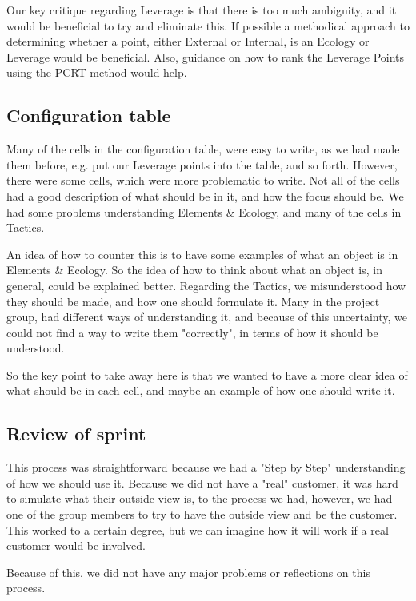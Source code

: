 Our key critique regarding Leverage is that there is too much ambiguity, and it would be beneficial to try and eliminate this. 
If possible a methodical approach to determining whether a point, either External or Internal, is an Ecology or Leverage would be beneficial.
Also, guidance on how to rank the Leverage Points using the PCRT method would help.

\subsection{Configuration table}
Many of the cells in the configuration table, were easy to write, as we had made them before, e.g. put our Leverage points into the table, and so forth.
However, there were some cells, which were more problematic to write.
Not all of the cells had a good description of what should be in it, and how the focus should be.
We had some problems understanding Elements \& Ecology, and many of the cells in Tactics.

An idea of how to counter this is to have some examples of what an object is in Elements \& Ecology.
So the idea of how to think about what an object is, in general, could be explained better. 
Regarding the Tactics, we misunderstood how they should be made, and how one should formulate it.
Many in the project group, had different ways of understanding it, and because of this uncertainty, we could not find a way to write them "correctly", in terms of how it should be understood.

So the key point to take away here is that we wanted to have a more clear idea of what should be in each cell, and maybe an example of how one should write it.

\subsection{Review of sprint}
This process was straightforward because we had a "Step by Step" understanding of how we should use it.
Because we did not have a "real" customer, it was hard to simulate what their outside view is, to the process we had, however, we had one of the group members to try to have the outside view and be the customer.
This worked to a certain degree, but we can imagine how it will work if a real customer would be involved.

Because of this, we did not have any major problems or reflections on this process.
